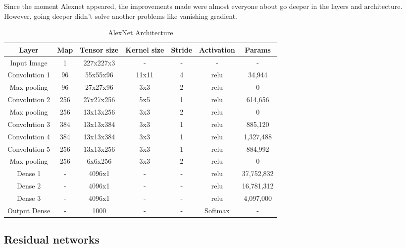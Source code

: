 Since the moment Alexnet appeared, the improvements made were almost everyone about go deeper in the layers and architecture. However, going deeper didn't solve another problems like vanishing gradient.

\begin{table}[!ht]
  \begin{center}
   \setlength\extrarowheight{2pt} %
   \begin{tabular}{c c c c c c c}
    \toprule
    \textbf{Layer} & \textbf{Map} & \textbf{Tensor size} & \textbf{Kernel size} & \textbf{Stride} & \textbf{Activation} & \textbf{Params}\\
    \hline   
    Input Image     & 1     & 227x227x3 & -     & - & -     & - \\
    Convolution 1   & 96    &  55x55x96 & 11x11 & 4 & relu & 34,944 \\
    Max pooling     & 96    &  27x27x96 & 3x3   & 2 & relu & 0 \\
    Convolution 2   & 256   & 27x27x256 & 5x5   & 1 & relu & 614,656 \\
    Max pooling     & 256   & 13x13x256 & 3x3   & 2 & relu & 0 \\
    Convolution 3   & 384   & 13x13x384 & 3x3   & 1 & relu & 885,120 \\
    Convolution 4   & 384   & 13x13x384 & 3x3   & 1 & relu & 1,327,488 \\
    Convolution 5   & 256   & 13x13x256 & 3x3   & 1 & relu & 884,992 \\
    Max pooling     & 256   &  6x6x256  & 3x3   & 2 & relu & 0 \\
    Dense 1         & -     &  4096x1   & -     & - & relu & 37,752,832 \\
    Dense 2         & -     & 4096x1    & -     & - & relu & 16,781,312 \\
    Dense 3         & -     & 4096x1    & -     & - & relu & 4,097,000 \\
    Output Dense    & -     & 1000      & -     & - & Softmax & - \\
    \bottomrule
    \end{tabular}
    \end{center}
    \caption{AlexNet Architecture \cite{alexnet}}
    \label{table:alexnet}
\end{table}

\subsection{Residual networks}

